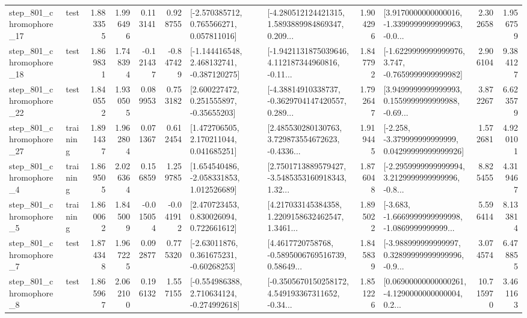 \begin{tabular}{llrrrrllrlrr}
  step\_801\_chromophore\_17 &      test &      1.883355 &    1.996496 &      0.113141 &  0.928755 &    [-2.570385712, 0.765566271, 0.057811016] &  [-4.280512124421315, 1.5893889984869347, 0.209... &       1.904296 &  [3.9170000000000016, -1.3399999999999963, -0.0... &            2.302658 &          1.956759 \\
  step\_801\_chromophore\_18 &      test &      1.869831 &    1.748394 &     -0.121437 & -0.847429 &   [-1.144416548, 2.468132741, -0.387120275] &  [-1.9421131875039646, 4.112187344960816, -0.11... &       1.847792 &  [-1.6229999999999976, 3.747, -0.7659999999999982] &            2.906104 &          9.384127 \\
  step\_801\_chromophore\_22 &      test &      1.840552 &    1.930505 &      0.089953 &  0.753182 &     [2.600227472, 0.251555897, -0.35655203] &  [-4.38814910338737, -0.3629704147420557, 0.289... &       1.792647 &  [3.9499999999999993, 0.1559999999999988, -0.69... &            3.872267 &          6.623579 \\
  step\_801\_chromophore\_27 &  training &      1.891437 &    1.962804 &      0.071367 &  0.612454 &     [1.472706505, 2.170211044, 0.041685251] &  [2.485530280130763, 3.729873554672623, -0.4336... &       1.919445 &  [-2.258, -3.379999999999999, 0.04299999999999926] &            1.572681 &          4.920101 \\
   step\_801\_chromophore\_4 &  training &      1.869505 &    2.026364 &      0.156859 &  1.259785 &    [1.654540486, -2.058331853, 1.012526689] &  [2.7501713889579427, -3.5485353160918343, 1.32... &       1.876048 &  [-2.2959999999999994, 3.2129999999999996, -0.8... &            8.825455 &          4.319467 \\
   step\_801\_chromophore\_5 &  training &      1.860062 &    1.845009 &     -0.015054 & -0.041912 &     [2.470723453, 0.830026094, 0.722661612] &  [4.217033145384358, 1.2209158632462547, 1.3461... &       1.895022 &  [-3.683, -1.6669999999999998, -1.0869999999999... &            5.596414 &          8.133814 \\
   step\_801\_chromophore\_7 &      test &      1.874348 &    1.967225 &      0.092877 &  0.775320 &     [-2.63011876, 0.361675231, -0.60268253] &  [4.4617720758768, -0.5895006769516739, 0.58649... &       1.845839 &  [-3.988999999999997, 0.32899999999999996, -0.9... &            3.074574 &          6.478855 \\
   step\_801\_chromophore\_8 &      test &      1.865967 &    2.062100 &      0.196132 &  1.557155 &   [-0.554986388, 2.710634124, -0.274992618] &  [-0.3505670150258172, 4.549193367311652, -0.34... &       1.851226 &  [0.06900000000000261, -4.1290000000000004, 0.2... &           10.715970 &          3.461163 \\

\end{tabular}
